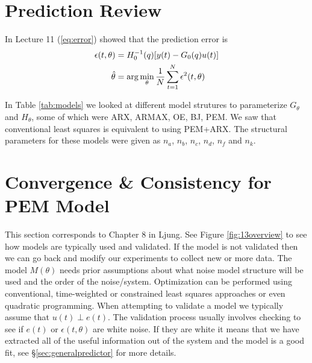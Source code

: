 
\mainmatter
\setcounter{page}{1}

\lectureseries[\course]{\course}

\date{November 10, 2009}

\setaddress

\setcounter{lecture}{12}
\setcounter{chapter}{12}


\section{Prediction Review}
In Lecture 11 (\ref{eq:error}) showed that the prediction error is
\begin{align*}
\epsilon(t,\theta) &= H_0^{-1}(q)[y(t)-G_0(q)u(t)] \\
\hat{\theta} &= \arg\min_\theta\frac{1}{N}\sum_{t=1}^N\epsilon^2(t,\theta)
\end{align*}

In Table \ref{tab:models} we looked at different model strutures to parameterize $G_\theta$ and $H_\theta$, some of which were ARX, ARMAX, OE, BJ, PEM. We saw that conventional least squares is equivalent to using PEM+ARX.  The structural parameters for these models were given as $n_a$, $n_b$, $n_c$, $n_d$, $n_f$ and $n_k$.

\section{Convergence \& Consistency for PEM Model}
This section corresponds to Chapter 8 in Ljung. See Figure \ref{fig:13overview} to see how models are typically used and validated. If the model is not validated then we can go back and modify our experiments to collect new or more data. The model $M(\theta)$ needs prior assumptions about what noise model structure will be used and the order of the noise/system. Optimization can be performed using conventional, time-weighted or constrained least squares approaches or even quadratic programming. When attempting to validate a model we typically assume that $u(t)\perp e(t)$. The validation process usually involves checking to see if $e(t)$ or $\epsilon(t,\theta)$ are white noise. If they are white it means that we have extracted all of the useful information out of the system and the model is a good fit, see \S\ref{sec:generalpredictor} for more details.

